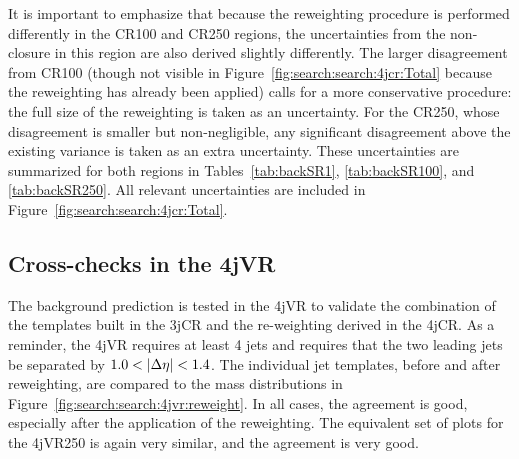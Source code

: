 It is important to emphasize that because the reweighting procedure is performed differently in the CR100 and CR250 regions, the uncertainties from the non-closure in this region are also derived slightly differently. The larger disagreement from CR100 (though not visible in Figure~\ref{fig:search:search:4jcr:Total} because the reweighting has already been applied) calls for a more conservative procedure: the full size of the reweighting is taken as an uncertainty. For the CR250,  whose disagreement is smaller but non-negligible, any significant disagreement above the existing variance is taken as an extra uncertainty. These uncertainties are summarized for both regions in Tables~\ref{tab:backSR1}, \ref{tab:backSR100}, and \ref{tab:backSR250}. All relevant uncertainties are included in Figure~\ref{fig:search:search:4jcr:Total}.



\subsection{Cross-checks in the 4jVR}


The background prediction is tested in the 4jVR to validate the combination of the templates built in the 3jCR and the re-weighting derived in the 4jCR. As a reminder, the 4jVR requires at least 4 jets and requires that the two leading jets be separated by $1.0 < |\Delta\eta| < 1.4$. The individual jet templates, before and after reweighting, are compared to the mass distributions in Figure~\ref{fig:search:search:4jvr:reweight}. In all cases, the agreement is good, especially after the application of the reweighting. The equivalent set of plots for the 4jVR250 is again very similar, and the agreement is very good. %

